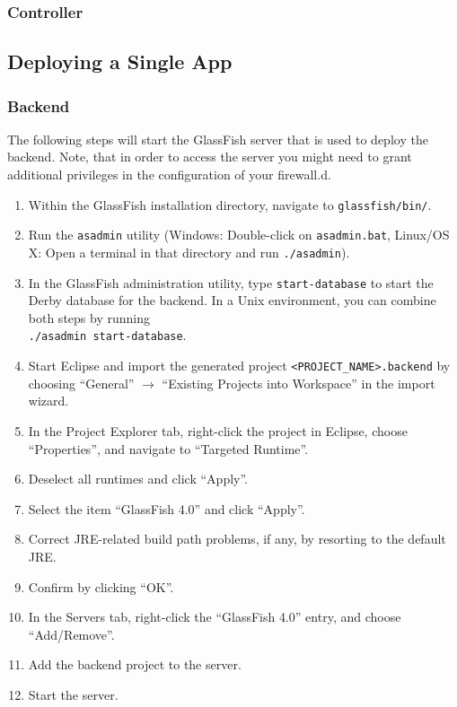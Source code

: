 \subsubsection{Controller} 
\label{subsubsec:Controller}



\subsection{Deploying a Single App}
\label{subsec:SingleAppDep}

\subsubsection{Backend} 
\label{subsubsec:Backend}

The following steps will start the GlassFish server that is used to deploy the backend.
Note, that in order to access the server you might need to grant additional privileges in the configuration of your firewall.d.

\begin{enumerate}
\item Within the GlassFish installation directory, navigate to \lstinline[language=Simple]|glassfish/bin/|.
\item Run the \lstinline[language=Simple]|asadmin| utility (Windows: Double-click on \lstinline[language=Simple]|asadmin.bat|, Linux/OS X: Open a terminal in that directory and run \lstinline[language=Simple]|./asadmin|).
\item In the GlassFish administration utility, type \lstinline[language=Simple]|start-database| to start the Derby database for the backend. In a Unix environment, you can combine both steps by running\\ \lstinline[language=Simple]|./asadmin start-database|.
\item Start Eclipse and import the generated project \lstinline[language=Simple]|<PROJECT_NAME>.backend| by choosing \enquote{General} $\rightarrow$ \enquote{Existing Projects into Workspace} in the import wizard.
\item In the Project Explorer tab, right-click the project in Eclipse, choose \enquote{Properties}, and navigate to \enquote{Targeted Runtime}.
\item Deselect all runtimes and click \enquote{Apply}.
\item Select the item \enquote{GlassFish 4.0} and click \enquote{Apply}.
\item Correct JRE-related build path problems, if any, by resorting to the default JRE.
\item Confirm by clicking \enquote{OK}.
\item In the Servers tab, right-click the \enquote{GlassFish 4.0} entry, and choose \enquote{Add/Remove}.
\item Add the backend project to the server.
\item Start the server.
\end{enumerate}



